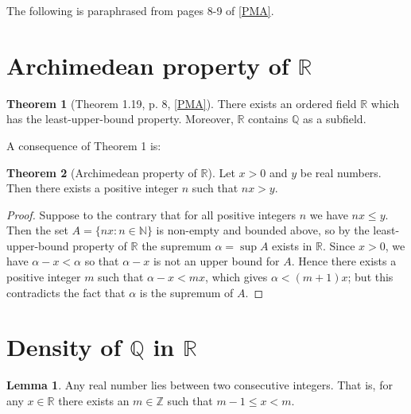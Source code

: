 \documentclass[12pt]{article}
\theoremstyle{definition}
\newtheorem{theorem}{Theorem}
\newtheorem{lemma}{Lemma}
\begin{document}
The following is paraphrased from pages 8-9 of \hyperlink{pma}{[PMA]}.

\section{Archimedean property of \texorpdfstring{\( \mathbb{R} \)}{}}

\begin{theorem}[Theorem 1.19, p. 8, \hyperlink{pma}{[PMA]}]

There exists an ordered field \( \mathbb{R} \) which has the least-upper-bound property. Moreover, \( \mathbb{R} \) contains \( \mathbb{Q} \) as a subfield.

\end{theorem}

A consequence of Theorem 1 is:

\begin{theorem}[Archimedean property of \( \mathbb{R} \)]

Let \( x > 0 \) and \( y \) be real numbers. Then there exists a positive integer \( n \) such that \( nx > y \).

\end{theorem}

\begin{proof}

Suppose to the contrary that for all positive integers \( n \) we have \( nx \leq y \). Then the set \( A = \{ nx : n \in \mathbb{N} \} \) is non-empty and bounded above, so by the least-upper-bound property of \( \mathbb{R} \) the supremum \( \alpha = \sup A \) exists in \( \mathbb{R} \). Since \( x > 0 \), we have \( \alpha - x < \alpha \) so that \( \alpha - x \) is not an upper bound for \( A \). Hence there exists a positive integer \( m \) such that \( \alpha - x < mx \), which gives \( \alpha < (m+1)x \); but this contradicts the fact that \( \alpha \) is the supremum of \( A \).
\end{proof}

\section{Density of \texorpdfstring{\( \mathbb{Q} \)}{} in \texorpdfstring{\( \mathbb{R} \)}{}}

\begin{lemma}

Any real number lies between two consecutive integers. That is, for any \( x \in \mathbb{R} \) there exists an \( m \in \mathbb{Z} \) such that \( m - 1 \leq x < m \).

\end{lemma}
\end{document}
